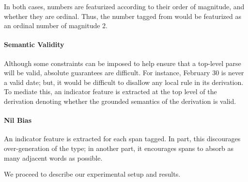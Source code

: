 In both cases, numbers are featurized according to their order of magnitude,
  and whether they are ordinal.
Thus, the number tagged from  would be featurized as an
  ordinal number of magnitude 2.

\paragraph{Semantic Validity}
Although some constraints can be imposed to help ensure that a top-level parse
  will be valid, absolute guarantees are difficult.
For instance, February 30 is never a valid date; but, it would be difficult
  to disallow any local rule in its derivation.
To mediate this, an indicator feature is extracted at the top level of the
  derivation denoting whether the grounded semantics of the derivation is
  valid.

\paragraph{Nil Bias}
An indicator feature is extracted for each  span tagged.
In part, this discourages over-generation of the type; in another part,
  it encourages  spans to absorb as many adjacent words as possible.


We proceed to describe our experimental setup and results.
